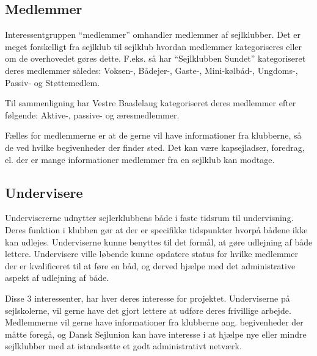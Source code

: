 \subsection{Medlemmer}

Interessentgruppen ``medlemmer'' omhandler medlemmer af sejlklubber. Det er meget forskelligt fra sejlklub til
sejlklub hvordan medlemmer kategoriseres eller om de overhovedet gøres dette. F.eks. så har ``Sejlklubben
Sundet'' kategoriseret deres medlemmer således: Voksen-, Bådejer-, Gaste-, Mini-kølbåd-, Ungdoms-, Passiv- og
Støttemedlem.

Til sammenligning har Vestre Baadelaug kategoriseret deres medlemmer efter følgende: Aktive-, passive- og
æresmedlemmer.

Fælles for medlemmerne er at de gerne vil have informationer fra klubberne, så de ved hvilke begivenheder der finder sted. Det kan være kapsejladser, foredrag, el. der er mange informationer medlemmer fra en sejlklub kan modtage.



\subsection{Undervisere}

Undervisererne udnytter sejlerklubbens både i faste tidsrum til undervisning. Deres funktion i
klubben gør at der er specifikke tidspunkter hvorpå bådene ikke kan udlejes. Underviserne kunne benyttes til
det formål, at gøre udlejning af både lettere. Undervisere ville løbende kunne opdatere status for hvilke
medlemmer der er kvalificeret til at føre en båd, og derved hjælpe med det administrative aspekt af udlejning
af både.

Disse 3 interessenter, har hver deres interesse for projektet. Underviserne på sejlskolerne, vil gerne have det gjort lettere at udføre deres frivillige arbejde. Medlemmerne vil gerne have informationer fra klubberne ang. begivenheder der måtte foregå, og Dansk Sejlunion kan have interesse i at hjælpe nye eller mindre sejlklubber med at istandsætte et godt administrativt netværk.

